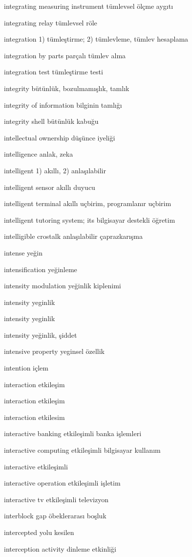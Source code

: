 \documentclass[12pt,fleqn]{article}\usepackage{../../common}
\begin{document}
integrating measuring instrument tümlevsel ölçme aygıtı

integrating relay tümlevsel röle

integration 1) tümleştirme; 2) tümlevleme, tümlev hesaplama

integration by parts parçalı tümlev alma

integration test tümleştirme testi

integrity bütünlük, bozulmamışlık, tamlık

integrity of information bilginin tamlığı

integrity shell bütünlük kabuğu

intellectual ownership düşünce iyeliği

intelligence anlak, zeka

intelligent 1) akıllı, 2) anlaşılabilir

intelligent sensor akıllı duyucu

intelligent terminal akıllı uçbirim, programlanır uçbirim

intelligent tutoring system; its bilgisayar destekli öğretim

intelligible crostalk anlaşılabilir çaprazkarışma

intense yeğin

intensification yeğinleme

intensity modulation yeğinlik kiplenimi

intensity yeginlik

intensity yeginlik

intensity yeğinlik, şiddet

intensive property yeginsel özellik

intention içlem

interaction etkileşim

interaction etkileşim

interaction etkilesim

interactive banking etkileşimli banka işlemleri

interactive computing etkileşimli bilgisayar kullanım

interactive etkileşimli

interactive operation etkileşimli işletim

interactive tv etkileşimli televizyon

interblock gap öbeklerarası boşluk

intercepted yolu kesilen

interception activity dinleme etkinliği
\end{document}
